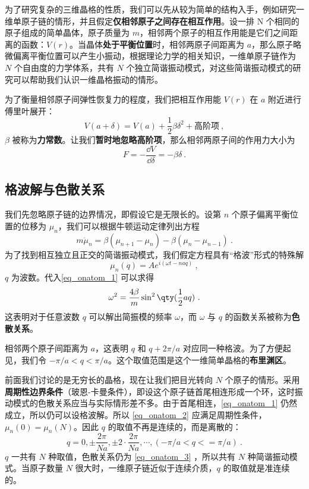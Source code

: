 

为了研究复杂的三维晶格的性质，我们可以先从较为简单的结构入手，例如研究一维单原子链的情形，并且假定\textbf{仅相邻原子之间存在相互作用}。设一排 N 个相同的原子组成的简单晶体，原子质量为 $m$，相邻两个原子的相互作用能是它们之间距离的函数：$V(r)$。当晶体\textbf{处于平衡位置}时，相邻两原子间距离为 $a$，那么原子略微偏离平衡位置可以产生小振动，根据理论力学的相关知识，一维单原子链作为 $N$ 个自由度的力学体系，共有 $N$ 个独立简谐振动模式，对这些简谐振动模式的研究可以帮助我们认识一维晶格振动的情形。

为了衡量相邻原子间弹性恢复力的程度，我们把相互作用能 $V(r)$ 在 $a$ 附近进行傅里叶展开：
\begin{equation}
V(a+\delta)=V(a)+\frac{1}{2}\beta \delta^2+\text{高阶项}~,
\end{equation}
$\beta$ 被称为\textbf{力常数}。让我们\textbf{暂时地忽略高阶项}，那么相邻两原子间的作用力大小为
\begin{equation}
F=-\frac{\dd V}{\dd \delta}=-\beta\delta~.
\end{equation}

\subsection{格波解与色散关系}
我们先忽略原子链的边界情况，即假设它是无限长的。设第 $n$ 个原子偏离平衡位置的位移为 $\mu_n$，我们可以根据牛顿运动定律列出方程
\begin{equation}\label{eq_onatom_1}
m \ddot \mu_n = \beta(\mu_{n+1}-\mu_n)-\beta(\mu_n - \mu_{n-1})~.
\end{equation}
为了找到相互独立且正交的简谐振动模式，我们假定方程具有“格波”形式的特殊解
\begin{equation}\label{eq_onatom_2}
\mu_{n}(q)=Ae^{i(\omega t-naq)}~,
\end{equation}
$q$ 为波数。代入\autoref{eq_onatom_1} 可以求得
\begin{equation}\label{eq_onatom_3}
\omega^2=\frac{4\beta}{m}\sin^2 \qty(\frac{1}{2}aq)~.
\end{equation}
这表明对于任意波数 $q$ 可以解出简振模的频率 $\omega$，而 $\omega$ 与 $q$ 的函数关系被称为\textbf{色散关系}。

相邻两个原子间距离为 $a$，这表明 $q$ 和 $q+2\pi/a$ 对应同一种格波。为了方便起见，我们令 $-\pi/a<q<\pi/a$。这个取值范围是这个一维简单晶格的\textbf{布里渊区}。

前面我们讨论的是无穷长的晶格，现在让我们把目光转向 $N$ 个原子的情形。采用\textbf{周期性边界条件}（玻恩-卡曼条件），即设这个原子链首尾相连形成一个环，这时振动模式的色散关系应当与实际情形差不多。由于首尾相连，\autoref{eq_onatom_1} 仍然成立，所以仍可以设格波解。所以 \autoref{eq_onatom_2} 应满足周期性条件，$\mu_n(0)=\mu_n(N)$。因此 $q$ 的取值不再是连续的，而是离散的：
\begin{equation}
q=0,\pm \frac{2\pi}{Na},\pm 2\cdot \frac{2\pi}{Na},\cdots, (-\pi/a<q<=\pi/a)~.
\end{equation}
$q$ 一共有 $N$ 种取值，色散关系仍为 \autoref{eq_onatom_3} ，所以共有 $N$ 种简谐振动模式。当原子数量 $N$ 很大时，一维原子链近似于连续介质，$q$ 的取值就是准连续的。
